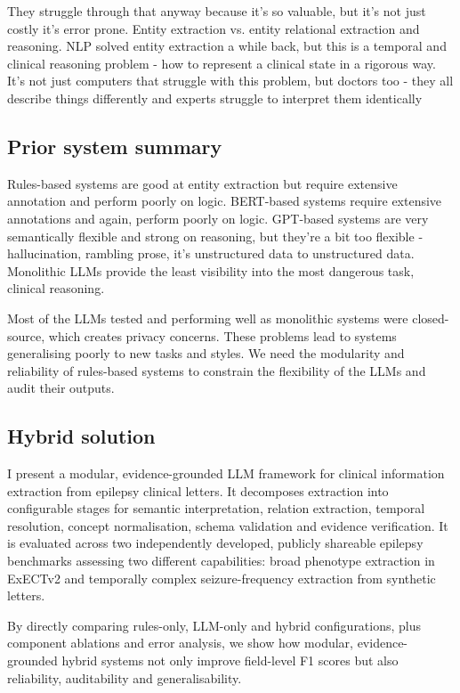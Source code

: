 \documentclass[conference]{IEEEtran}
\begin{document}
They struggle through that anyway because it’s so valuable, but it’s 
not just costly it’s error prone. Entity extraction vs. entity relational 
extraction and reasoning. NLP solved entity extraction a while back, 
but this is a temporal and clinical reasoning problem - how to 
represent a clinical state in a rigorous way. It’s not just computers 
that struggle with this problem, but doctors too - they all describe 
things differently and experts struggle to interpret them identically 

\subsection{Prior system summary}
Rules-based systems are good at entity extraction but require 
extensive annotation and perform poorly on logic. BERT-based 
systems require extensive annotations and again, perform poorly 
on logic. GPT-based systems are very semantically flexible and 
strong on reasoning, but they’re a bit too flexible - hallucination, 
rambling prose, it’s unstructured data to unstructured data. 
Monolithic LLMs provide the least visibility into the most dangerous
task, clinical reasoning.

Most of the LLMs tested and performing well as monolithic systems 
were closed-source, which creates privacy concerns. These 
problems lead to systems generalising poorly to new tasks and styles. 
We need the modularity and reliability of rules-based systems to constrain 
the flexibility of the LLMs and audit their outputs.

\subsection{Hybrid solution}
I present a modular, evidence-grounded LLM framework for clinical 
information extraction from epilepsy clinical letters. It decomposes 
extraction into configurable stages for semantic interpretation, relation 
extraction, temporal resolution, concept normalisation, schema validation 
and evidence verification. It is evaluated across two independently 
developed, publicly shareable epilepsy benchmarks assessing two 
different capabilities: broad phenotype extraction in ExECTv2 and 
temporally complex seizure-frequency extraction from synthetic letters.

By directly comparing rules-only, LLM-only and hybrid configurations, plus 
component ablations and error analysis, we show how modular, 
evidence-grounded hybrid systems not only improve field-level F1 scores 
but also reliability, auditability and generalisability.
\end{document}
